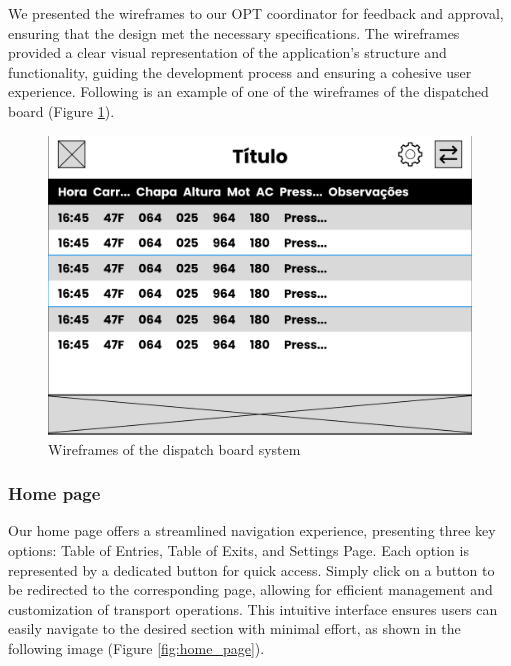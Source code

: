 \documentclass[10pt]{article}
\begin{document}
        We presented the wireframes to our OPT coordinator for feedback and approval, ensuring that the design met the necessary specifications. The wireframes provided a clear visual representation of the application's structure and functionality, guiding the development process and ensuring a cohesive user experience. Following is an example of one of the wireframes of the dispatched board (Figure \ref{fig:wireframes}).

        \vfill
        \begin{figure}[htbp]
            \centering
            \includegraphics[width=1\textwidth]{wireframe}
            \caption{Wireframes of the dispatch board system}
            \label{fig:wireframes}
        \end{figure}


        \subsubsection{Home page}

        Our home page offers a streamlined navigation experience, presenting three key options: Table of Entries, Table of Exits, and Settings Page. Each option is represented by a dedicated button for quick access. Simply click on a button to be redirected to the corresponding page, allowing for efficient management and customization of transport operations. This intuitive interface ensures users can easily navigate to the desired section with minimal effort, as shown in the following image (Figure \ref{fig:home_page}).
\end{document}
